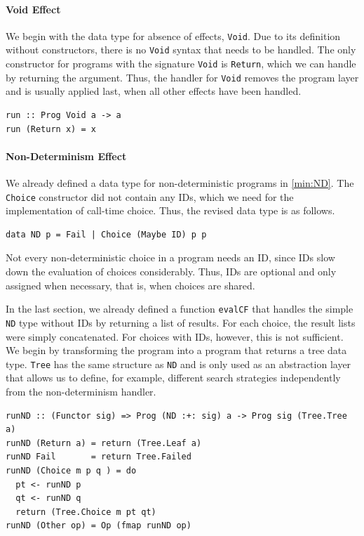 \documentclass[a4paper, 11pt, fleqn, twoside, abstract=on]{scrreprt}
\newcommand{\hinl}[1]{\texttt{#1}}
\begin{document}
\paragraph{Void Effect}
We begin with the data type for absence of effects, \hinl{Void}.
Due to its definition without constructors, there is no \hinl{Void} syntax that needs to be handled.
The only constructor for programs with the signature \hinl{Void} is \hinl{Return}, which we can handle by returning the argument.
Thus, the handler for \hinl{Void} removes the program layer and is usually applied last, when all other effects have been handled.

\begin{verbatim}
run :: Prog Void a -> a
run (Return x) = x
\end{verbatim}

\paragraph{Non-Determinism Effect}
We already defined a data type for non-deterministic programs in \autoref{min:ND}.
The \hinl{Choice} constructor did not contain any IDs, which we need for the implementation of call-time choice.
Thus, the revised data type is as follows.

\begin{verbatim}
data ND p = Fail | Choice (Maybe ID) p p
\end{verbatim}

Not every non-deterministic choice in a program needs an ID, since IDs slow down the evaluation of choices considerably.
Thus, IDs are optional and only assigned when necessary, that is, when choices are shared.

In the last section, we already defined a function \hinl{evalCF} that handles the simple \hinl{ND} type without IDs by returning a list of results.
For each choice, the result lists were simply concatenated.
For choices with IDs, however, this is not sufficient.
We begin by transforming the program into a program that returns a tree data type.
\hinl{Tree} has the same structure as \hinl{ND} and is only used as an abstraction layer that allows us to define, for example, different search strategies independently from the non-determinism handler.
 
\begin{verbatim}
runND :: (Functor sig) => Prog (ND :+: sig) a -> Prog sig (Tree.Tree a)
runND (Return a) = return (Tree.Leaf a)
runND Fail       = return Tree.Failed
runND (Choice m p q ) = do
  pt <- runND p
  qt <- runND q
  return (Tree.Choice m pt qt)
runND (Other op) = Op (fmap runND op)
\end{verbatim}
\end{document}
